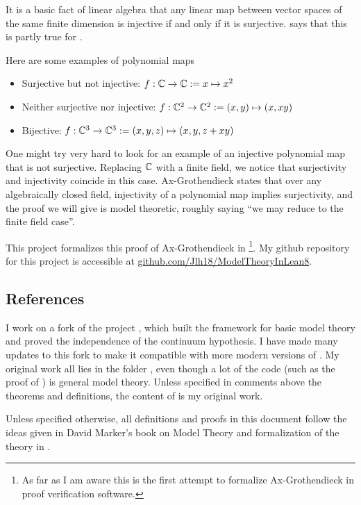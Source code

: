 It is a basic fact of linear algebra that any linear map
between vector spaces of the same finite dimension is
injective if and only if it is surjective.
 says that this is
partly true for .

Here are some examples of polynomial maps
\begin{itemize}
  \item Surjective but not injective: $f : \mathbb{C} \to \mathbb{C} := x \mapsto x^{2}$
  \item Neither surjective nor injective:
      $f : \mathbb{C}^{2} \to \mathbb{C}^{2} := (x,y) \mapsto (x,xy)$
  \item Bijective:
      $f : \mathbb{C}^{3} \to \mathbb{C}^{3} := (x,y,z) \mapsto ( x , y , z + xy )$
\end{itemize}

One might try very hard to look for an example of an injective polynomial map
that is not surjective.
Replacing $\mathbb{C}$ with a finite field, we notice that
surjectivity and injectivity coincide in this case.
Ax-Grothendieck states that over any algebraically closed field,
injectivity of a polynomial map implies surjectivity,
and the proof we will give is model theoretic,
roughly saying ``we may reduce to the finite field case''.

This project formalizes this proof of Ax-Grothendieck in \footnote{
  As far as I am aware this is the first attempt to formalize Ax-Grothendieck in
  proof verification software. }.
My github repository for this project is accessible at
\url{github.com/Jlh18/ModelTheoryInLean8}.

\subsection*{References}

I work on a fork of the  project \cite{flypitch},
which built the framework for basic model theory and proved the
independence of the continuum hypothesis.
I have made many updates to this fork to make it compatible with
more modern versions of .
My original work all lies in the folder ,
even though a lot of the code (such as the proof of )
is general model theory.
Unless specified in comments above the theorems and definitions,
the content of  is my original work.

Unless specified otherwise,
all definitions and proofs in this document follow the ideas given in
David Marker's book on Model Theory \cite{marker} and formalization of the theory in .
